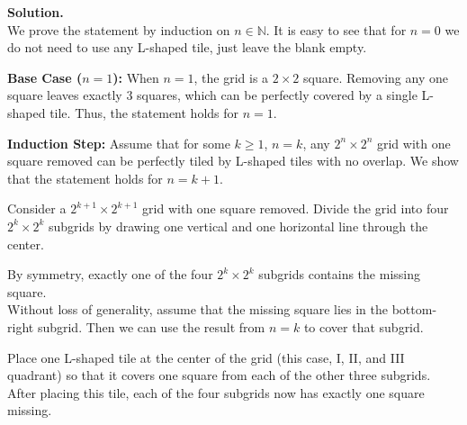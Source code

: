 \documentclass[12pt]{article}
\newcommand{\answer}{\vspace{2em} \textbf{Solution. }}
\newcommand{\N}{\mathbb{N}} %
\begin{document}
\answer  %
\\
We prove the statement by induction on $n \in \N$. It is easy to see that for $n=0$ we do not need to use any L-shaped tile, just leave the blank empty.

\textbf{Base Case ($n=1$):}
When $n=1$, the grid is a $2 \times 2$ square.
Removing any one square leaves exactly 3 squares, which can be perfectly covered by a single L-shaped tile.
Thus, the statement holds for $n=1$.

\textbf{Induction Step:}
Assume that for some $k \ge 1$, $n=k$, any $2^n \times 2^n$ grid with one square removed can be perfectly tiled by L-shaped tiles with no overlap.
We show that the statement holds for $n = k+1$.

Consider a $2^{k+1} \times 2^{k+1}$ grid with one square removed.
Divide the grid into four $2^k \times 2^k$ subgrids by drawing one vertical and one horizontal line through the center.
\begin{center}
\end{center}
By symmetry, exactly one of the four $2^k \times 2^k$ subgrids contains the missing square.\\
Without loss of generality, assume that the missing square lies in the bottom-right subgrid. Then we can use the result from $n=k$ to cover that subgrid.
\begin{center}
\end{center}
Place one L-shaped tile at the center of the grid (this case, I, II, and III quadrant) so that it covers one square from each of the other three subgrids.
After placing this tile, each of the four subgrids now has exactly one square missing.
\end{document}
